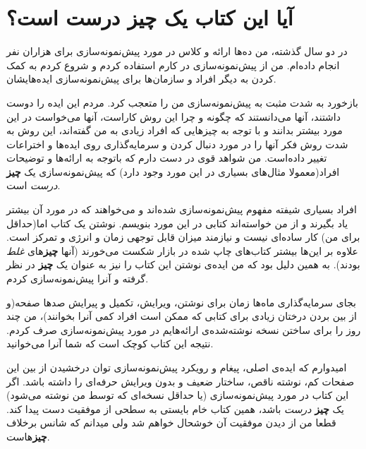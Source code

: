 \section{آیا این کتاب یک چیز درست
است؟}\label{ux622ux6ccux627-ux627ux6ccux646-ux6a9ux62aux627ux628-ux6ccux6a9-ux686ux6ccux632-ux62fux631ux633ux62a-ux627ux633ux62a}

در دو سال گذشته، من ده‌ها ارائه و کلاس در مورد پیش‌نمونه‌سازی برای
هزاران نفر انجام داده‌ام. من از پیش‌نمونه‌سازی در کارم استفاده کردم و
شروع کردم به کمک کردن به دیگر افراد و سازمان‌ها برای پیش‌نمونه‌سازی
ایده‌هایشان.

بازخورد به شدت مثبت به پیش‌نمونه‌سازی من را متعجب کرد. مردم این ایده را
دوست داشتند، آنها می‌دانستند که چگونه و چرا این روش کاراست، آنها
می‌خواست در این مورد بیشتر بدانند و با توجه به چیزهایی که افراد زیادی به
من گفته‌اند، این روش به شدت روش فکر آنها را در مورد دنبال کردن و
سرمایه‌گذاری روی ایده‌ها و اختراعات تغییر داده‌است. من شواهد قوی در دست
دارم که باتوجه به ارائه‌ها و توضیحات افراد(معمولا مثال‌های بسیاری در این
مورد وجود دارد) که پیش‌نمونه‌سازی یک \textbf{چیز} \emph{درست} است.

افراد بسیاری شیفته مفهوم پیش‌نمونه‌سازی شده‌اند و می‌خواهند که در مورد
آن بیشتر یاد بگیرند و از من خواسته‌اند کتابی در این مورد بنویسم. نوشتن
یک کتاب اما(حداقل برای من) کار ساده‌ای نیست و نیازمند میزان قابل توجهی
زمان و انرژی و تمرکز است. علاوه بر این‌ها بیشتر کتاب‌های چاپ شده در
بازار شکست می‌خورند (آنها \textbf{چیز}های \emph{غلط} بودند). به همین
دلیل بود که من ایده‌ی نوشتن این کتاب را نیز به عنوان یک \textbf{چیز} در
نظر گرفته و آنرا پیش‌نمونه‌سازی کردم.

بجای سرمایه‌گذاری ماه‌ها زمان برای نوشتن، ویرایش، تکمیل و پیرایش صدها
صفحه(و از بین بردن درختان زیادی برای کتابی که ممکن است افراد کمی آنرا
بخوانند)، من چند روز را برای ساختن نسخه نوشته‌شده‌ی ارائه‌هایم در مورد
پیش‌نمونه‌سازی صرف کردم. نتیجه این کتاب کوچک است که شما آنرا می‌خوانید.

امیدوارم که ایده‌ی اصلی، پیغام و رویکرد پیش‌نمونه‌سازی توان درخشیدن از
بین این صفحات کم، نوشته ناقص، ساختار ضعیف و بدون ویرایش حرفه‌ای را داشته
باشد. اگر این کتاب در مورد پیش‌نمونه‌سازی (یا حداقل نسخه‌ای که توسط من
نوشته می‌شود) یک \textbf{چیز} \emph{درست} باشد، همین کتاب خام بایستی به
سطحی از موفقیت دست پیدا کند. قطعا من از دیدن موفقیت آن خوشحال خواهم شد
ولی میدانم که شانس برخلاف \textbf{چیز}هاست.

